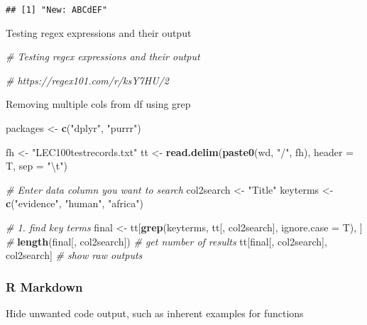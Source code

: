 \documentclass[10,portrait]{article}
\newenvironment{Shaded}{\begin{snugshade}}{\end{snugshade}}
\newcommand{\KeywordTok}[1]{\textcolor[rgb]{0.13,0.29,0.53}{\textbf{#1}}}
\newcommand{\DataTypeTok}[1]{\textcolor[rgb]{0.13,0.29,0.53}{#1}}
\newcommand{\CharTok}[1]{\textcolor[rgb]{0.31,0.60,0.02}{#1}}
\newcommand{\StringTok}[1]{\textcolor[rgb]{0.31,0.60,0.02}{#1}}
\newcommand{\CommentTok}[1]{\textcolor[rgb]{0.56,0.35,0.01}{\textit{#1}}}
\newcommand{\NormalTok}[1]{#1}
\begin{document}
\begin{verbatim}
## [1] "New: ABCdEF"
\end{verbatim}

Testing regex expressions and their output

\begin{Shaded}
\begin{Highlighting}[]
\CommentTok{# Testing regex expressions and their output}

\CommentTok{# https://regex101.com/r/ksY7HU/2}
\end{Highlighting}
\end{Shaded}

Removing multiple cols from df using grep

\begin{Shaded}
\begin{Highlighting}[]
\NormalTok{packages <-}\StringTok{ }\KeywordTok{c}\NormalTok{(}\StringTok{"dplyr"}\NormalTok{, }\StringTok{"purrr"}\NormalTok{)}

\NormalTok{fh <-}\StringTok{ "LEC100testrecords.txt"}
\NormalTok{tt <-}\StringTok{ }\KeywordTok{read.delim}\NormalTok{(}\KeywordTok{paste0}\NormalTok{(wd, }\StringTok{"/"}\NormalTok{, fh), }\DataTypeTok{header =}\NormalTok{ T, }\DataTypeTok{sep =} \StringTok{"}\CharTok{\textbackslash{}t}\StringTok{"}\NormalTok{)}

\CommentTok{# Enter data column you want to search}
\NormalTok{col2search <-}\StringTok{ "Title"}
\NormalTok{keyterms <-}\StringTok{ }\KeywordTok{c}\NormalTok{(}\StringTok{"evidence"}\NormalTok{, }\StringTok{"human"}\NormalTok{, }\StringTok{"africa"}\NormalTok{)}

\CommentTok{# 1. find key terms}
\NormalTok{final <-}\StringTok{ }\NormalTok{tt[}\KeywordTok{grep}\NormalTok{(keyterms, tt[, col2search], }\DataTypeTok{ignore.case =}\NormalTok{ T), }
\NormalTok{    ]  }\CommentTok{#}
\KeywordTok{length}\NormalTok{(final[, col2search])  }\CommentTok{# get number of results}
\NormalTok{tt[final[, col2search], col2search]  }\CommentTok{# show raw outputs }
\end{Highlighting}
\end{Shaded}

\subsubsection{R Markdown}\label{r-markdown}

Hide unwanted code output, such as inherent examples for functions
\end{document}
